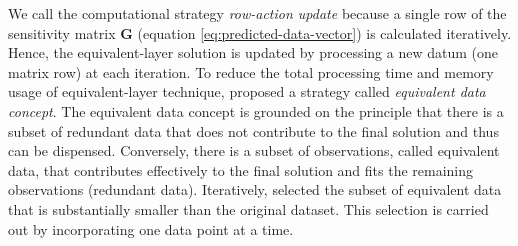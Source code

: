 We call the computational strategy \textit{row-action update} because a single row of the sensitivity matrix  
$\mathbf{G}$ (equation \ref{eq:predicted-data-vector}) is calculated iteratively.
Hence, the equivalent-layer solution is updated by processing a new datum (one matrix row) at each iteration.
To reduce the total processing time and memory usage of equivalent-layer technique, \cite{mendonca-silva1994} proposed 
a strategy called \textit{equivalent data concept}.
The equivalent data concept is grounded on the  principle  that there is a subset of redundant data that does not 
contribute to the final solution and thus can be dispensed.
Conversely, there is a subset of observations, called equivalent data, that  contributes effectively to the 
final solution and fits the remaining observations (redundant data).
Iteratively, \cite{mendonca-silva1994} selected the subset of equivalent data that is substantially smaller than 
the original dataset. 
This selection is carried out by incorporating one data point at a time.

